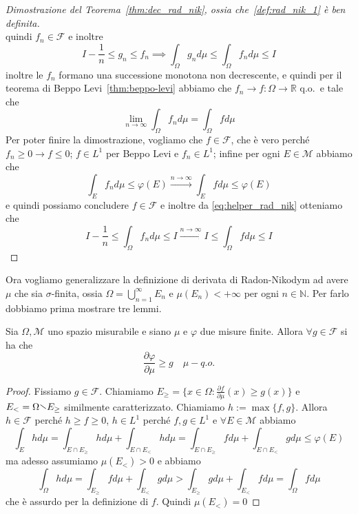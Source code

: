 \begin{proof}[Dimostrazione del Teorema~\ref{thm:dec_rad_nik}, ossia
    che~\ref{def:rad_nik_1} è ben definita]
\[    \]
    quindi \(f_{n} \in \mathcal{F}\) e inoltre 
    \begin{equation}\label{eq:helper_rad_nik}
        I - \frac{1}{n} \le g_{n} \le f_{n} \implies \int_\Omega g_{n} d\mu \le \int_\Omega f_{n}
        d\mu \le I
    \end{equation}
    inoltre le \(f_{n}\) formano una successione monotona non decrescente, e
    quindi per il teorema di Beppo Levi~\ref{thm:beppo-levi} abbiamo che \(f_{n}
    \to f : \Omega \to \mathbb{R}\) q.o.~e tale che 
    \[
        \lim_{n \to \infty} \int_\Omega f_{n} d\mu = \int_\Omega f d\mu
    \]
    Per poter finire la dimostrazione, vogliamo che \(f \in \mathcal{F}\), che è
    vero perché \(f_{n} \ge 0 \to f \le 0\); \(f \in L^{1}\) per Beppo Levi e
    \(f_{n} \in L^{1}\); infine per ogni \(E \in \mathcal{M}\) abbiamo che
    \[
        \int_E f_{n} d\mu \le \varphi {(E)} \overset{n \to
        \infty}{\longrightarrow} \int_E f d\mu \le \varphi {(E)}
    \]
    e quindi possiamo concludere \(f \in \mathcal{F}\) e inoltre da
    \eqref{eq:helper_rad_nik} otteniamo che
    \[
        I - \frac{1}{n} \le \int_\Omega f_{n} d\mu \le I
        \overset{n \to \infty}{\longrightarrow}I \le \int_\Omega f d\mu \le I
    \]
\end{proof}
Ora vogliamo generalizzare la definizione di derivata di Radon-Nikodym ad avere
\(\mu\) che sia \(\sigma\)-finita, ossia \(\Omega = \bigcup_{n=1}^{\infty}
E_{n}\) e \(\mu(E_{n}) < +\infty\) per ogni \(n \in \mathbb{N}\). Per farlo
dobbiamo prima mostrare tre lemmi.
\begin{lemma}\label{lem:rad_nik_1}
    Sia \(\Omega, \mathcal{M}\) uno spazio misurabile e siano \(\mu\) e
    \(\varphi \) due misure finite. Allora \(\forall g \in \mathcal{F}\) si ha
    che
    \[
        \frac{\partial \varphi}{\partial \mu} \ge g \quad \mu-q.o.
    \]
\end{lemma}
\begin{proof}
    Fissiamo \(g \in \mathcal{F}\). Chiamiamo \(E_{\ge } = \{x \in \Omega :
    \frac{\partial f}{\partial \mu} {(x )} \ge g{(x)}\} \) e \(E_< = \Omega
    \sminus E_{\ge }  \) similmente caratterizzato. Chiamiamo \(h := \max \{f,
    g\} \). Allora \(h \in \mathcal{F}\) perché \(h \ge f\ge 0\), \(h \in
    L^{1}\) perché \(f, g \in L^{1}\) e \(\forall E \in \mathcal{M}\) abbiamo
    \[
        \int_E h d\mu = \int_{E \cap E_{\ge }} h d\mu + \int_{E \cap E_{<}} h
        d\mu = \int_{E \cap E_{\ge }} f d\mu + \int_{E \cap E_{<}} g d\mu \le \varphi
        {(E)}
    \]
    ma adesso assumiamo \(\mu{(E_<)} > 0\) e abbiamo
    \[
        \int_\Omega h d\mu = \int_{E_{\ge }} f d\mu + \int_{E_{<}} g d\mu >
        \int_{E_{\ge } } g d\mu + \int_{E_{<}} f d\mu = \int_\Omega f d\mu
    \]
    che è assurdo per la definizione di \(f\). Quindi \(\mu{(E_<)} = 0\)
\end{proof}

